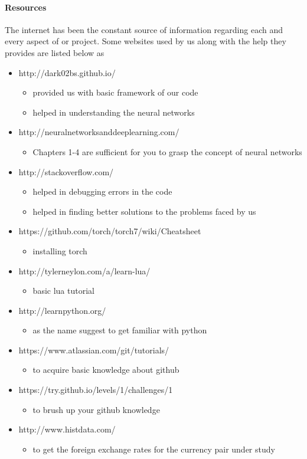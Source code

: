 \documentclass{article}
\begin{document}
\paragraph{Resources}
The internet has been the constant source of information regarding each and every aspect of or project. Some websites used by us along with the help they provides are listed below as
	\begin{itemize}
		\item http://dark02bs.github.io/ 
 			\begin{itemize}
				\item provided us with basic framework of our code
				\item helped in understanding the neural networks
			\end{itemize}
		\item  http://neuralnetworksanddeeplearning.com/
			\begin{itemize}
				\item Chapters 1-4 are sufficient for you to grasp the concept of neural networks
			\end{itemize}
		\item http://stackoverflow.com/
			\begin{itemize}
				\item helped in debugging errors in the code
				\item helped in finding better solutions to the problems faced by us
			\end{itemize}
		\item https://github.com/torch/torch7/wiki/Cheatsheet
			\begin{itemize}
				\item installing torch
			\end{itemize}
		\item http://tylerneylon.com/a/learn-lua/
			\begin{itemize}
				\item basic lua tutorial
			\end{itemize}
		\item http://learnpython.org/
			\begin{itemize}
				\item as the name suggest to get familiar with python
			\end{itemize}
		\item https://www.atlassian.com/git/tutorials/
			\begin{itemize}
				\item to acquire basic knowledge about github
			\end{itemize}
		\item https://try.github.io/levels/1/challenges/1
			\begin{itemize}
				\item to brush up your github knowledge
			\end{itemize}
		\item http://www.histdata.com/
			\begin{itemize}
				\item to get the foreign exchange rates for the currency pair under study
			\end{itemize}
	\end{itemize}
 
\end{document}
